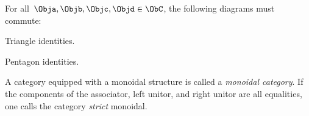 \begin{ctdefinition}
   \condit
   
   For all~$\Obja,\Objb,\Objc,\Objd\in \ObC$, the following diagrams must commute:
    \begin{compactenum}
    \item Triangle identities. 
  \begin{center}
  \end{center}
  \item Pentagon identities.\\
  \end{compactenum}
  \begin{center}
  \end{center}
  
  \noindent A category equipped with a monoidal structure is called a \emph{monoidal category}.
  If the components of the associator, left unitor, and right unitor are all equalities, one calls the category \emph{strict} monoidal.
\end{ctdefinition}


